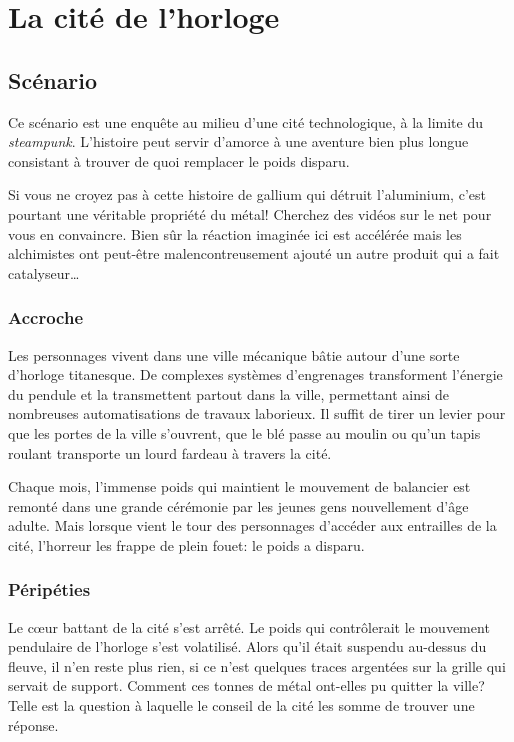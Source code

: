 \chapter{La cité de l'horloge}

\section{Scénario}

Ce scénario est une enquête au milieu d'une cité \medfan technologique, à la limite du \emph{steampunk}.
L'histoire peut servir d'amorce à une aventure bien plus longue consistant à trouver de quoi remplacer le poids disparu.

Si vous ne croyez pas à cette histoire de gallium qui détruit l'aluminium, c'est pourtant une véritable propriété du métal! Cherchez des vidéos sur le net pour vous en convaincre.
Bien sûr la réaction imaginée ici est accélérée mais les alchimistes ont peut-être malencontreusement ajouté un autre produit qui a fait catalyseur\dots

\subsection{Accroche}

Les personnages vivent dans une ville mécanique bâtie autour d'une sorte d'horloge titanesque.
De complexes systèmes d'engrenages transforment l'énergie du pendule et la transmettent partout dans la ville, permettant ainsi de nombreuses automatisations de travaux laborieux.
Il suffit de tirer un levier pour que les portes de la ville s'ouvrent, que le blé passe au moulin ou qu'un tapis roulant transporte un lourd fardeau à travers la cité.

Chaque mois, l'immense poids qui maintient le mouvement de balancier est remonté dans une grande cérémonie par les jeunes gens nouvellement d'âge adulte.
Mais lorsque vient le tour des personnages d'accéder aux entrailles de la cité, l'horreur les frappe de plein fouet: le poids a disparu.

\subsection{Péripéties}

Le cœur battant de la cité s'est arrêté.
Le poids qui contrôlerait le mouvement pendulaire de l'horloge s'est volatilisé.
Alors qu'il était suspendu au-dessus du fleuve, il n'en reste plus rien, si ce n'est quelques traces argentées sur la grille qui servait de support.
Comment ces tonnes de métal ont-elles pu quitter la ville?
Telle est la question à laquelle le conseil de la cité les somme de trouver une réponse.

